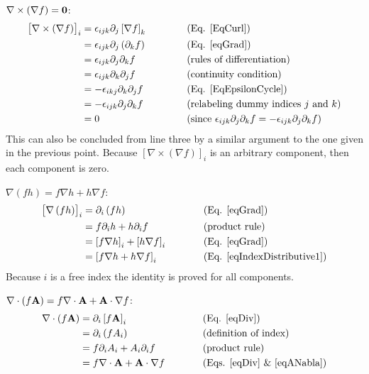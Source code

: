  $\nabla\times\left(\nabla f\right)=\mathbf{ 0}$:
\begin{equation}
\begin{aligned}\left[\nabla\times\left(\nabla f\right)\right]_{i} & 
=\epsilon_{ijk}\partial_{j}\left[\nabla f\right]_{k} & 
\,\,\,\,\,\,\,\,\,\,\,\,\,\,\,\,\,\,\, & \text{(Eq. \ref{EqCurl})}\\
 & =\epsilon_{ijk}\partial_{j}\left(\partial_{k}f\right) &  & \text{(Eq. 
\ref{eqGrad})}\\
 & =\epsilon_{ijk}\partial_{j}\partial_{k}f &  & \text{(rules of 
differentiation)}\\
 & =\epsilon_{ijk}\partial_{k}\partial_{j}f &  & \text{(continuity condition)}\\
 & =-\epsilon_{ikj}\partial_{k}\partial_{j}f &  & \text{(Eq. 
\ref{EqEpsilonCycle})}\\
 & =-\epsilon_{ijk}\partial_{j}\partial_{k}f &  & \text{(relabeling dummy 
indices \ensuremath{j} and \ensuremath{k})}\\
 & =0 &  & \text{(since 
\ensuremath{\epsilon_{ijk}\partial_{j}\partial_{k}f=-\epsilon_{ijk}\partial_{j}
\partial_{k}f})}
\end{aligned}
\end{equation}
This can also be concluded from line three by a similar argument to
the one given in the previous point. Because $\left[\nabla\times\left(\nabla 
f\right)\right]_{i}$
is an arbitrary component, then each component is zero.

 $\nabla\left(fh\right)=f\nabla h+h\nabla f$:
\begin{equation}
\begin{aligned}\left[\nabla\left(fh\right)\right]_{i} & 
=\partial_{i}\left(fh\right) & \,\,\,\,\,\,\,\,\,\,\,\,\,\,\,\,\, & \text{(Eq. 
\ref{eqGrad})}\\
 & =f\partial_{i}h+h\partial_{i}f &  & \text{(product rule)}\\
 & =\left[f\nabla h\right]_{i}+\left[h\nabla f\right]_{i} &  & \text{(Eq. 
\ref{eqGrad})}\\
 & =\left[f\nabla h+h\nabla f\right]_{i} &  & \text{(Eq. 
\ref{eqIndexDistributive1})}
\end{aligned}
\end{equation}
Because $i$ is a free index the identity is proved for all components.

 
$\nabla\cdot\left(f\mathbf{ A}\right)=f\nabla\cdot\mathbf{ A}+\mathbf{ A}
\cdot\nabla f$:
\begin{equation}
\begin{aligned}\nabla\cdot\left(f\mathbf{ A}\right) & 
=\partial_{i}\left[f\mathbf{ A}\right]_{i} & \,\,\,\,\,\,\,\,\,\,\,\,\,\,\,\,\, & 
\text{(Eq. \ref{eqDiv})}\\
 & =\partial_{i}\left(fA_{i}\right) &  & \text{(definition of index)}\\
 & =f\partial_{i}A_{i}+A_{i}\partial_{i}f &  & \text{(product rule)}\\
 & =f\nabla\cdot\mathbf{ A}+\mathbf{ A}\cdot\nabla f &  & \text{(Eqs. \ref{eqDiv} 
\& \ref{eqANabla})}
\end{aligned}
\end{equation}


